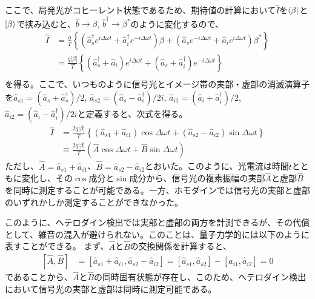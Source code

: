 ここで、局発光がコヒーレント状態であるため、期待値の計算において$\hat I$を$\bra \beta$と$\ket \beta$で挟み込むと、$\hat b \to \beta$, $\hat b^\dagger \to \beta^*$のように変化するので、
\begin{equation}
\begin{aligned}
  	\hat I &= \frac{q}{T}\left\{
  	\left(\hat a_s^\dagger e^{i\Delta \omega t} + \hat a_i^\dagger e^{-i\Delta \omega t}\right) \beta + 
  	\left(
  		\hat a_s e^{-i\Delta \omega t} + \hat a_i e^{i\Delta \omega t}
  	\right) \beta^*
  	\right\}\\
  	&= \frac{q|\beta|}{T}\left\{ (\hat a_s^\dagger + \hat a_i) e^{i\Delta \omega t} + (\hat a_s + \hat a_i^\dagger) e^{-i\Delta \omega t} \right\}\\
\end{aligned}
\end{equation}
を得る。ここで、いつものように信号光とイメージ帯の実部・虚部の消滅演算子を$\hat a_{s1} = (\hat a_s + \hat a_s^\dagger)/2$, $\hat a_{s2} = (\hat a_s - \hat a_s^\dagger)/2i$, $\hat a_{i1} = (\hat a_i + \hat a_i^ \dagger)/2$, $\hat a_{i2} = (\hat a_i - \hat a_i^ \dagger)/2i$と定義すると、次式を得る。
\begin{equation}
\begin{aligned}
  \hat I &= \frac{2q|\beta|}{T}\left\{ (\hat a_{s1} + \hat a_{i1}) \cos \Delta \omega t  + (\hat a_{s2} - \hat a_{i2})\sin \Delta \omega t\right\}\\
  &\equiv \frac{2q|\beta|}{T}(\hat A \cos \Delta \omega t + \hat B\sin \Delta \omega t)
\end{aligned}
\end{equation}
ただし、$\hat A = \hat a_{s1} + \hat a_{i1}$、$\hat B = \hat a_{s2} - \hat a_{i2}$とおいた。このように、光電流は時間$t$とともに変化し、その$\cos$成分と$\sin$成分から、信号光の複素振幅の実部$\hat A$と虚部$\hat B$を同時に測定することが可能である。一方、ホモダインでは信号光の実部と虚部のいずれかしか測定することができなかった。

このように、ヘテロダイン検出では実部と虚部の両方を計測できるが、その代償として、雑音の混入が避けられない。このことは、量子力学的には以下のように表すことができる。
まず、$\hat A$と$\hat B$の交換関係を計算すると、
\begin{equation}
  \begin{aligned}
  	\left[\hat A, \hat B\right] &= [\hat a_{s1} + \hat a_{i1}, \hat a_{s2} - \hat a_{i2}] = [\hat a_{s1}, \hat a_{s2}] - [\hat a_{i1}, \hat a_{i2}] = 0
  \end{aligned}
\end{equation}
であることから、$\hat A$と$\hat B$の同時固有状態が存在し、このため、ヘテロダイン検出において信号光の実部と虚部は同時に測定可能である。

